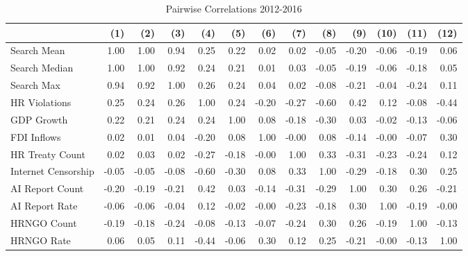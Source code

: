 \begin{table}[ht]
\centering
\begin{tabular}{|l|rrrrrrrrrrrr|}
  \hline
 & (1) & (2) & (3) & (4) & (5) & (6) & (7) & (8) & (9) & (10) & (11) & (12) \\ 
  \hline
Search Mean & 1.00 & 1.00 & 0.94 & 0.25 & 0.22 & 0.02 & 0.02 & -0.05 & -0.20 & -0.06 & -0.19 & 0.06 \\ 
  Search Median & 1.00 & 1.00 & 0.92 & 0.24 & 0.21 & 0.01 & 0.03 & -0.05 & -0.19 & -0.06 & -0.18 & 0.05 \\ 
  Search Max & 0.94 & 0.92 & 1.00 & 0.26 & 0.24 & 0.04 & 0.02 & -0.08 & -0.21 & -0.04 & -0.24 & 0.11 \\ 
  HR Violations & 0.25 & 0.24 & 0.26 & 1.00 & 0.24 & -0.20 & -0.27 & -0.60 & 0.42 & 0.12 & -0.08 & -0.44 \\ 
  GDP Growth & 0.22 & 0.21 & 0.24 & 0.24 & 1.00 & 0.08 & -0.18 & -0.30 & 0.03 & -0.02 & -0.13 & -0.06 \\ 
  FDI Inflows & 0.02 & 0.01 & 0.04 & -0.20 & 0.08 & 1.00 & -0.00 & 0.08 & -0.14 & -0.00 & -0.07 & 0.30 \\ 
  HR Treaty Count & 0.02 & 0.03 & 0.02 & -0.27 & -0.18 & -0.00 & 1.00 & 0.33 & -0.31 & -0.23 & -0.24 & 0.12 \\ 
  Internet Censorship & -0.05 & -0.05 & -0.08 & -0.60 & -0.30 & 0.08 & 0.33 & 1.00 & -0.29 & -0.18 & 0.30 & 0.25 \\ 
  AI Report Count & -0.20 & -0.19 & -0.21 & 0.42 & 0.03 & -0.14 & -0.31 & -0.29 & 1.00 & 0.30 & 0.26 & -0.21 \\ 
  AI Report Rate & -0.06 & -0.06 & -0.04 & 0.12 & -0.02 & -0.00 & -0.23 & -0.18 & 0.30 & 1.00 & -0.19 & -0.00 \\ 
  HRNGO Count & -0.19 & -0.18 & -0.24 & -0.08 & -0.13 & -0.07 & -0.24 & 0.30 & 0.26 & -0.19 & 1.00 & -0.13 \\ 
  HRNGO Rate & 0.06 & 0.05 & 0.11 & -0.44 & -0.06 & 0.30 & 0.12 & 0.25 & -0.21 & -0.00 & -0.13 & 1.00 \\ 
   \hline
\end{tabular}
\caption{Pairwise Correlations 2012-2016} 
\end{table}
